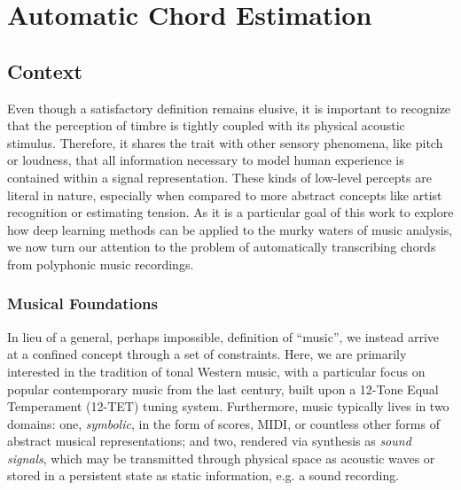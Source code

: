 

\graphicspath{{5/figures/}}

\chapter{Automatic Chord Estimation}
\label{chp:chord_estimation}

\section{Context}
\label{sec:context}

Even though a satisfactory definition remains elusive, it is important to recognize that the perception of timbre is tightly coupled with its physical acoustic stimulus.
Therefore, it shares the trait with other sensory phenomena, like pitch or loudness, that all information necessary to model human experience is contained within a signal representation.
These kinds of low-level percepts are literal in nature, especially when compared to more abstract concepts like artist recognition or estimating tension.
As it is a particular goal of this work to explore how deep learning methods can be applied to the murky waters of music analysis, we now turn our attention to the problem of automatically transcribing chords from polyphonic music recordings.

\subsection{Musical Foundations}
\label{subsec:musical_foundations}

In lieu of a general, perhaps impossible, definition of ``music'', we instead arrive at a confined concept through a set of constraints.
Here, we are primarily interested in the tradition of tonal Western music, with a particular focus on popular contemporary music from the last century, built upon a 12-Tone Equal Temperament (12-TET) tuning system.
Furthermore, music typically lives in two domains: one, \emph{symbolic}, in the form of scores, MIDI, or countless other forms of abstract musical representations; and two, rendered via synthesis as \emph{sound signals}, which may be transmitted through physical space as acoustic waves or stored in a persistent state as static information, e.g. a sound recording.

